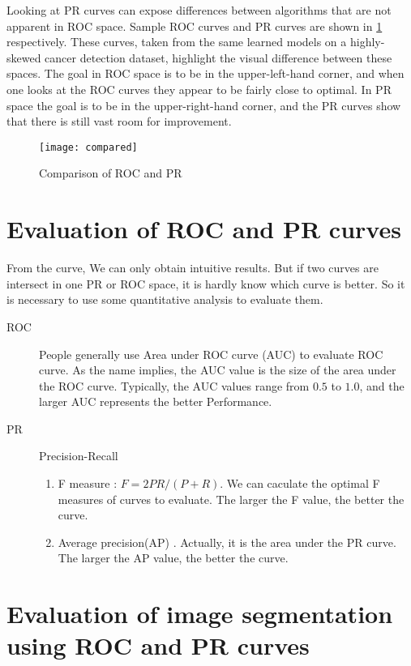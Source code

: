 \documentclass[a4paper,12pt]{article}
\begin{document}
Looking at PR curves can expose differences between algorithms that are not apparent in ROC space. Sample ROC curves and PR curves are shown in \ref{comparison} respectively. These curves, taken from the same learned models on a highly-skewed cancer detection dataset, highlight the visual difference between
these spaces. The goal in ROC space is to be in the upper-left-hand corner, and when one looks at the ROC curves they appear to be fairly close to optimal. In PR space the goal is to be in the upper-right-hand corner, and the PR curves show that there is still vast room for improvement.

\begin{figure}[!ht]
\centering\texttt{[image: compared]}
\caption{Comparison of ROC and PR}\label{comparison}
\end{figure} 

\section{Evaluation  of ROC and PR curves} 
 
From the curve, We can only obtain intuitive results. But if two curves are intersect in one PR or ROC space, it is hardly know which curve is better. So it is necessary to use some quantitative analysis to evaluate them.
\begin{description}
\item[ROC] People generally use Area under ROC curve (AUC) to evaluate ROC curve. As the name implies, the AUC value is the size of the area under the ROC curve. Typically, the AUC values range from $0.5$ to $1.0$, and the larger AUC represents the better Performance.
\item[PR] Precision-Recall
\begin{enumerate}
\item F measure \cite{4:article} \cite{7:misc}: $F=2PR/(P+R)$. We can caculate the optimal F measures of curves to evaluate. The larger the F value, the better the curve.
\item Average precision(AP) \cite{3:article} \cite{5:article}. Actually, it is the area under the PR curve. The larger the AP value, the better the curve. 
\end{enumerate}
\end{description}


\section{Evaluation of image segmentation using ROC and PR curves}
\end{document}
